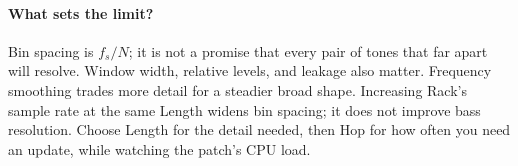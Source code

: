 \paragraph{What sets the limit?}
Bin spacing is $f_s/N$; it is not a promise that every pair of tones that far
apart will resolve. Window width, relative levels, and leakage also matter.
Frequency smoothing trades more detail for a steadier broad shape. Increasing
Rack's sample rate at the same Length widens bin spacing; it does not improve
bass resolution. Choose Length for the detail needed, then Hop for how often
you need an update, while watching the patch's CPU load.
